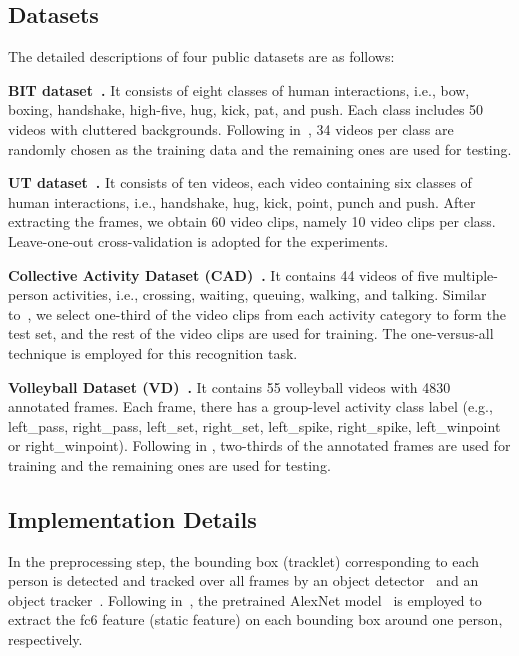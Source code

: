 \documentclass[9pt,journal,letterpaper,twocolumn]{IEEEtran}
\begin{document}
	\vspace{-2mm}
	\subsection{Datasets}
	The detailed descriptions of four public datasets are as follows:	
	\begin{itemize}	
		\item	{\bf BIT dataset~\cite{kong2012leraning}.} It consists of eight classes of human interactions, i.e., bow, boxing, handshake, high-five, hug, kick,
		pat, and push. Each class includes 50 videos with cluttered  backgrounds.  Following in~\cite{kong2014interactive}, 34 videos per class are randomly chosen as the training data and the remaining ones are used for testing.	
		\item 	{\bf UT dataset~\cite{ryoo2009spatio}.}
		It consists of  ten  videos, each video containing six classes of human interactions, i.e., handshake, hug, kick, point, punch and push. After extracting the frames, we obtain 60 video clips, namely 10 video clips per class. Leave-one-out cross-validation is adopted for the experiments.
		
		\item 	{\bf Collective Activity Dataset (CAD)~\cite{choi2009they}.} It contains 44 videos of five multiple-person activities, i.e., crossing, waiting, queuing, walking, and talking. Similar to~\cite{lan2012discriminative,hajimirsadeghi2015visual}, we select one-third of the video clips from each activity category to form the test set, and the rest of the video clips are used for training. The one-versus-all technique is employed for this recognition task.		
		
		{ \item {\bf Volleyball Dataset (VD)~\cite{ibrahim2015hierarchical}.} It contains 55 volleyball videos with 4830 annotated frames. Each frame, there has a group-level activity class label (e.g., left\_pass, right\_pass, left\_set,  right\_set, left\_spike, right\_spike, left\_winpoint or right\_winpoint). Following in \cite{ibrahim2015hierarchical}, two-thirds of the annotated frames are used for training and the remaining ones are used for testing.}
	\end{itemize}
	
	
	
	\subsection{Implementation Details}
	In the preprocessing step, the bounding box (tracklet) corresponding to each  person is  detected  and  tracked  over all frames  by
	an object detector~\cite{girshick2015fast} and an object tracker~\cite{zamir2012gmcp}. Following in~\cite{donahue2015long}, the pretrained AlexNet model~\cite{krizhevsky2012imagenet} is employed to extract the fc6 feature (static feature) on each bounding box around one person, respectively.
	
\end{document}
